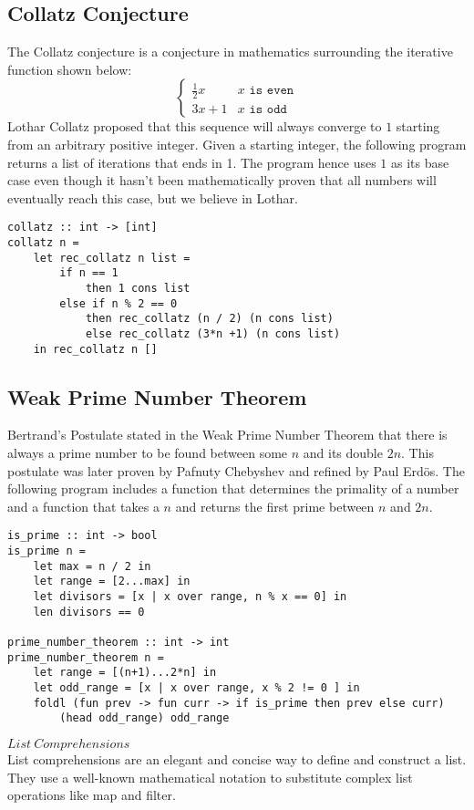 ﻿\documentclass[5pt]{article}
\begin{document}
\subsection{Collatz Conjecture}
The Collatz conjecture is a conjecture in mathematics surrounding the iterative 
function shown below:
$$ \begin{cases} 
      \frac{1}{2}x & x \texttt{ is even} \\
      3x + 1 & x \texttt{ is odd} 
   \end{cases}
$$
Lothar Collatz proposed that this sequence will always converge to $1$ starting 
from an arbitrary positive integer. Given a starting integer, the following 
program returns a list of iterations that ends in 1. The program hence uses $1$ 
as its base case even though it hasn't been mathematically proven that all 
numbers will eventually reach this case, but we believe in Lothar.
\begin{lstlisting}[language=rippl]
collatz :: int -> [int]
collatz n =
    let rec_collatz n list =
        if n == 1
            then 1 cons list
        else if n % 2 == 0
            then rec_collatz (n / 2) (n cons list)
            else rec_collatz (3*n +1) (n cons list)
    in rec_collatz n []
\end{lstlisting}
\subsection{Weak Prime Number Theorem}
Bertrand's Postulate stated in the Weak Prime Number Theorem that there is 
always a prime number to be found between some $n$ and its double $2n$. This 
postulate was later proven by Pafnuty Chebyshev and refined by Paul Erd\"{o}s. 
The following program includes a function that determines the primality of a 
number and a function that takes a $n$ and returns the first prime between 
$n$ and $2n$.
\begin{lstlisting}[language=rippl]
is_prime :: int -> bool
is_prime n =
    let max = n / 2 in
    let range = [2...max] in
    let divisors = [x | x over range, n % x == 0] in
    len divisors == 0
    
prime_number_theorem :: int -> int
prime_number_theorem n =
    let range = [(n+1)...2*n] in
    let odd_range = [x | x over range, x % 2 != 0 ] in
    foldl (fun prev -> fun curr -> if is_prime then prev else curr)
        (head odd_range) odd_range
\end{lstlisting}



\noindent $List \ Comprehensions$ \\
List comprehensions are an elegant and concise way to define and construct a list. They use a well-known mathematical notation to substitute complex list operations like map and filter. \\
\end{document}
